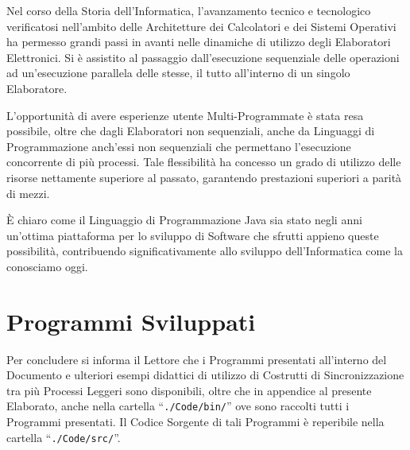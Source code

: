 Nel corso della Storia dell'Informatica, l'avanzamento tecnico e tecnologico verificatosi nell'ambito delle Architetture dei Calcolatori e dei Sistemi Operativi ha permesso grandi passi in avanti nelle dinamiche di utilizzo degli Elaboratori Elettronici. Si è assistito al passaggio dall'esecuzione sequenziale delle operazioni ad un'esecuzione parallela delle stesse, il tutto all'interno di un singolo Elaboratore. \par
L'opportunità di avere esperienze utente Multi-Programmate è stata resa possibile, oltre che dagli Elaboratori non sequenziali, anche da Linguaggi di Programmazione anch'essi non sequenziali che permettano l'esecuzione concorrente di più processi. Tale flessibilità ha concesso un grado di utilizzo delle risorse nettamente superiore al passato, garantendo prestazioni superiori a parità di mezzi. \par
È chiaro come il Linguaggio di Programmazione Java sia stato negli anni un'ottima piattaforma per lo sviluppo di Software che sfrutti appieno queste possibilità, contribuendo significativamente allo sviluppo dell'Informatica come la conosciamo oggi. \par

\section{Programmi Sviluppati}
Per concludere si informa il Lettore che i Programmi presentati all'interno del Documento e ulteriori esempi didattici di utilizzo di Costrutti di Sincronizzazione tra più Processi Leggeri sono disponibili, oltre che in appendice al presente Elaborato, anche nella cartella ``\texttt{./Code/bin/}'' ove sono raccolti tutti i Programmi presentati. Il Codice Sorgente di tali Programmi è reperibile nella cartella ``\texttt{./Code/src/}''.